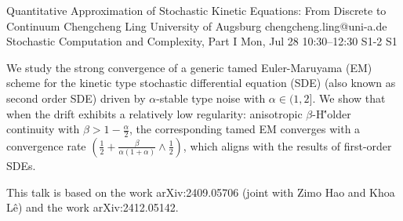 \begin{talk}
  {Quantitative Approximation of Stochastic Kinetic Equations: From Discrete to Continuum}%
  {Chengcheng Ling}%
  {University of Augsburg}%
  {chengcheng.ling@uni-a.de}%
  {Stochastic Computation and Complexity, Part I}%
  {}%
  {Mon, Jul 28 10:30–12:30}%
  {S1-2}%
  {S1}%

We study the strong convergence of a generic tamed Euler-Maruyama (EM) scheme for the kinetic type stochastic differential equation (SDE) (also known as second order SDE) driven by $\alpha$-stable type noise with $\alpha\in(1,2]$. We show that when the drift exhibits a relatively low regularity: anisotropic $\beta$-H\''older continuity with $\beta >1 - \frac{\alpha}{2}$, the corresponding tamed EM converges with a convergence rate $(\frac{1}{2} + \frac{\beta}{\alpha(1+\alpha)} \wedge \frac{1}{2})$, which aligns with the results of  first-order SDEs.


This talk is based on the work arXiv:2409.05706 (joint with Zimo Hao and Khoa L\^e)  and the work arXiv:2412.05142.

\medskip


\end{talk}

